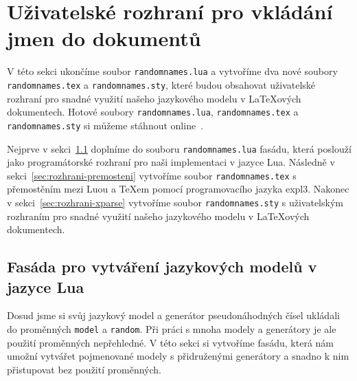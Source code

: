 \documentclass{csbulletin}
\let\exampleoutput\emph
\newcommand\vref[1]{\ref{#1} na straně~\pageref{#1}}
\let\vref=\ref
\begin{document}
\noindent
\exampleoutput{}

\section{Uživatelské rozhraní pro vkládání jmen do dokumentů}
\label{sec:rozhrani}

V této sekci ukončíme soubor \texttt{randomnames.lua} a vytvoříme dva nové soubory \texttt{randomnames.tex} a \texttt{randomnames.sty}, které budou obsahovat uživatelské rozhraní pro snadné využití našeho jazykového modelu v \LaTeX ových dokumentech. Hotové soubory \texttt{randomnames.lua}, \texttt{randomnames.tex} a \texttt{randomnames.sty} si můžeme stáhnout online~\cite{novotny2023napadovnik}.

Nejprve v sekci~\ref{sec:rozhrani-fasada} doplníme do souboru \texttt{randomnames.lua} fasádu, která poslouží jako programátorské rozhraní pro naši implementaci v jazyce Lua. Následně v sekci~\vref{sec:rozhrani-premosteni} vytvoříme soubor \texttt{randomnames.tex} s přemostěním mezi Luou a \TeX em pomocí programovacího jazyka expl3. Nakonec v sekci~\vref{sec:rozhrani-xparse} vytvoříme soubor \texttt{randomnames.sty} s uživatelským rozhraním pro snadné využití našeho jazykového modelu v \LaTeX ových dokumentech.

\subsection{Fasáda pro vytváření jazykových modelů v jazyce Lua}
\label{sec:rozhrani-fasada}

Dosud jsme si svůj jazykový model a generátor pseudonáhodných čísel ukládali do proměnných \texttt{model} a \texttt{random}. Při práci s mnoha modely a generátory je ale použití proměnných nepřehledné. V této sekci si vytvoříme fasádu, která nám umožní vytvářet pojmenované modely s přidruženými generátory a snadno k nim přistupovat bez použití proměnných.
\end{document}
